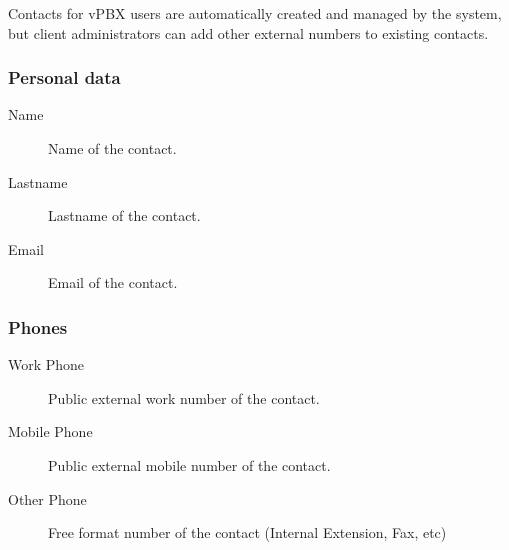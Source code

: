 \documentclass[letterpaper,10pt,english]{sphinxmanual}
\begin{document}
Contacts for vPBX users are automatically created and managed by the system,
but client administrators can add other external numbers to existing contacts.


\subsubsection{Personal data}
\label{administration_portal/client/vpbx/addressbook:personal-data}\begin{description}
\item[{Name}] \leavevmode{}\label{administration_portal/client/vpbx/addressbook:term-name}
Name of the contact.

\item[{Lastname}] \leavevmode{}\label{administration_portal/client/vpbx/addressbook:term-lastname}
Lastname of the contact.

\item[{Email}] \leavevmode{}\label{administration_portal/client/vpbx/addressbook:term-email}
Email of the contact.

\end{description}


\subsubsection{Phones}
\label{administration_portal/client/vpbx/addressbook:phones}\begin{description}
\item[{Work Phone}] \leavevmode{}\label{administration_portal/client/vpbx/addressbook:term-work-phone}
Public external work number of the contact.

\item[{Mobile Phone}] \leavevmode{}\label{administration_portal/client/vpbx/addressbook:term-mobile-phone}
Public external mobile number of the contact.

\item[{Other Phone}] \leavevmode{}\label{administration_portal/client/vpbx/addressbook:term-other-phone}
Free format number of the contact (Internal Extension, Fax, etc)

\end{description}
\end{document}
